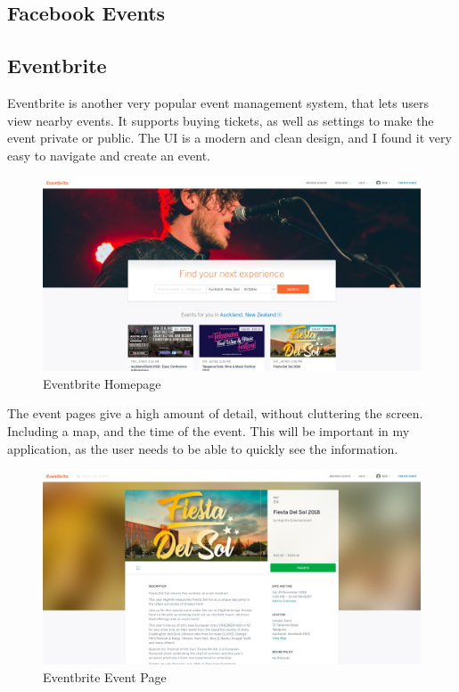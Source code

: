 \documentclass[a4paper,oneside,12pt]{report}
\begin{document}
	\subsection{Facebook Events}

	\subsection{Eventbrite}
	Eventbrite is another very popular event management system, that lets users view nearby events.
	It supports buying tickets, as well as settings to make the event private or public. The UI is a modern and clean design, and I found it very easy to navigate and create an event.

	\begin{figure}[H]
		\caption{Eventbrite Homepage}
		\includegraphics[width=\linewidth]{static/eventbrite-home.png}
	\end{figure}

	The event pages give a high amount of detail, without cluttering the screen. Including a map, and the time of the event. This will be important in my application, as the user needs to be able to quickly see the information.

	\begin{figure}[H]
		\caption{Eventbrite Event Page}
		\includegraphics[width=\linewidth]{static/eventbrite-event.png}
	\end{figure}
\end{document}
